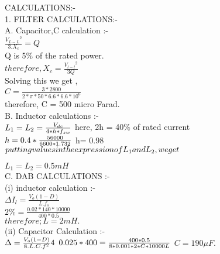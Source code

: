\documentclass{article} %
\begin{document}
\Large CALCULATIONS:- \\

    1. FILTER CALCULATIONS:-\\
    
      A. Capacitor,C calculation :- \\
      
    $  \frac{{V_{L-L}}^2}{3.X_c} = Q $ \\
    Q is 5\% of the rated power. \\
   $ therefore, X_{c} =\frac{{V_{l-l}}^2}{3 Q}$ \\ 
   
   Solving this we get ,  \\
   
  $  C = \frac{3 * 2800}{ 2 * \pi * 50 * 6.6 * 6.6 * 10^{6}} $ \\
   therefore, C = 500 micro Farad. \\
   
     B. Inductor calculations :-  \\
    $  L_{1} = L_{2} = \frac{V_{dc}}{4 *h* f_{sw}} \\ $
      here, 2h = 40\% of rated current \\
$      h= 0.4* \frac{56000}{6600 * 1.732} \\ $
       h= 0.98 \\
$putting values in the expression of L_{1} and L_{2} ,we get \\$
       
$       L_{1} =L_{2} = 0.5mH $ \\

      C.  DAB CALCULATIONS :- \\
       (i) inductor calculation :- \\
       
  $     \Delta I_l = \frac{V_o (1-D)}{L . f_s} $ \\
      $   2\% = \frac{0.02 *140*10000}{400* 0.5} $ \\
    $  therefore       ; L = 2mH . $ \\
    
       (ii) Capacitor Calculation :- \\
       $ \Delta = \frac{V_o (1-D)}{8.L.C. f^{2}} 4 \\ $
      $ 0.025 * 400 = \frac{400 * 0.5}{8* 0.001 *2*C*10000 L} \\ $
    $   C = 190 \mu F. $ \\
   
      
      
\end{document}
